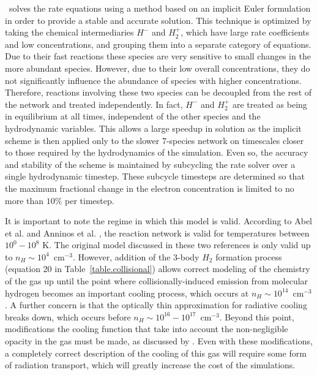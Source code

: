 \enzo\ solves the rate equations using a method based on an implicit
Euler formulation in order to provide a stable and accurate solution.  This technique is
optimized by taking the chemical intermediaries $H^-$ and $H_2^+$, which have 
large rate coefficients and low concentrations, and grouping them into a separate
category of equations.  Due to their fast reactions these species are very sensitive
to small changes in the more abundant species.  However, due to their low overall
concentrations, they do not significantly influence the abundance of species with
higher concentrations.  Therefore, reactions involving these two species can be
decoupled from the rest of the network and treated independently.  In fact, $H^-$ 
and $H_2^+$ are treated as being in equilibrium at all times, independent of 
the other species and the hydrodynamic variables.  This allows a large speedup
in solution as the implicit scheme is then applied only to the slower 7-species network
on timescales closer to those required by the hydrodynamics of the simulation.
Even so, the accuracy and stability of the scheme is maintained by subcycling the 
rate solver over a single hydrodynamic timestep.  These subcycle timesteps are 
determined so that the maximum fractional change in the electron concentration is
limited to no more than $10\%$ per timestep.

It is important to note the regime in which this model is valid.  According to Abel et al. and
Anninos et al. \citep{abel97,anninos97}, the reaction network is valid for temperatures
between $10^0 - 10^8$ K.  The original model discussed in these two references is only
valid up to $n_H \sim 10^4$~cm$^{-3}$.  However, addition of the 3-body $H_2$ formation
process (equation 20 in Table~\ref{table.collisional}) allows 
correct modeling of the chemistry of the gas up
until the point where collisionally-induced emission from molecular hydrogen becomes an important
cooling process, which occurs at $n_H \sim 10^{14}$~cm$^{-3}$.  A further concern is that
the optically thin approximation for radiative cooling breaks down, which
occurs before $n_H \sim 10^{16} - 10^{17}$~cm$^{-3}$.  Beyond this point, 
modifications the cooling function that take into account the non-negligible
opacity in the gas must be made, as discussed by \citet{2004MNRAS.348.1019R}. 
Even with these modifications, a completely correct description of the cooling of
this gas will require some form of radiation transport, which will greatly 
increase the cost of the simulations.

